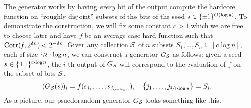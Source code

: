 \documentclass[11pt]{article}
\begin{document}
\noindent
The generator works by having \emph{every} bit of the output compute the hardcore function on ``roughly disjoint'' subsets of the bits of the seed $s \in \{\pm 1\}^{O(\log n)}$. To demonstrate the construction, we will fix some constant $c > 1$ which we are free to choose later and have $f$ be an average case hard function such that $\mathrm{Corr}(f, 2^{\delta n}) < 2^{-\delta n}$. Given any collection $\mathcal{S}$ of $n$ subsets $S_1, \ldots, S_n \subseteq [c \log n]$, each of size $\sfrac{2}{\delta} \cdot \log n$, we can construct a generator $G_{\mathcal{S}}$ as follows: given a seed $s \in \{\pm 1\}^{c \cdot \log n}$, the $i$-th output of $G_{\mathcal{S}}$ will correspond to the evaluation of $f$ on the subset of bits $S_i$,
\begin{equation*}
    (G_{\mathcal{S}}(s))_{i} = f(s_{j_1}, \ldots, s_{j_{\sfrac{2}{\delta} \cdot \log n}}), \quad \left\{j_1, \ldots, j_{\sfrac{2}{\delta} \cdot \log n}\right\} = S_i.
\end{equation*}
\iffalse
As a picture, our psuedorandom generator $G_{\mathcal{S}}$ looks something like this.
\end{document}
